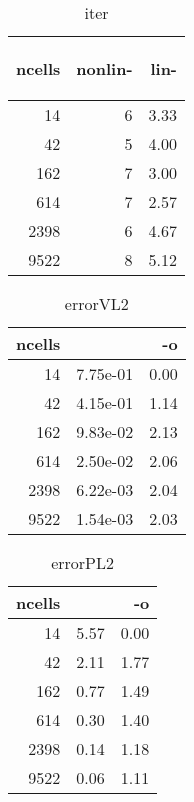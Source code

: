 \documentclass[11pt]{article}
\newcommand{\sw}[1]{\begin{sideways} #1 \end{sideways}}
\begin{document}
\begin{table}[!htbp]
\begin{center}
\begin{tabular}{r||r|r}
\sw{ncells} &\sw{nonlin-} &\sw{lin-}\\\hline\hline
             14&              6&      3.33\\\hline
             42&              5&      4.00\\\hline
            162&              7&      3.00\\\hline
            614&              7&      2.57\\\hline
           2398&              6&      4.67\\\hline
           9522&              8&      5.12\\\hline
\end{tabular}
\caption{iter}
\end{center}
\label{tab:iter}
\end{table}
%
%
\begin{table}[!htbp]
\begin{center}
\begin{tabular}{r||r|r}
ncells           &                  & -o              \\\hline\hline
             14&  7.75e-01&    0.00\\\hline
             42&  4.15e-01&    1.14\\\hline
            162&  9.83e-02&    2.13\\\hline
            614&  2.50e-02&    2.06\\\hline
           2398&  6.22e-03&    2.04\\\hline
           9522&  1.54e-03&    2.03\\\hline
\end{tabular}
\caption{errorVL2}
\end{center}
\label{tab:errorVL2}
\end{table}
%
%
\begin{table}[!htbp]
\begin{center}
\begin{tabular}{r||r|r}
ncells           &                  & -o              \\\hline\hline
             14&      5.57&    0.00\\\hline
             42&      2.11&    1.77\\\hline
            162&      0.77&    1.49\\\hline
            614&      0.30&    1.40\\\hline
           2398&      0.14&    1.18\\\hline
           9522&      0.06&    1.11\\\hline
\end{tabular}
\caption{errorPL2}
\end{center}
\label{tab:errorPL2}
\end{table}
\end{document}
